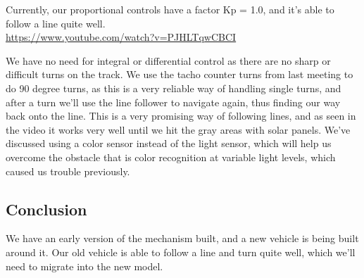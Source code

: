 Currently, our proportional controls have a factor Kp = 1.0, and it's
able to follow a line quite
well.\\\url{https://www.youtube.com/watch?v=PJHLTqwCBCI}

We have no need for integral or differential control as there are no
sharp or difficult turns on the track. We use the tacho counter turns
from last meeting to do 90 degree turns, as this is a very reliable way
of handling single turns, and after a turn we'll use the line follower
to navigate again, thus finding our way back onto the line. This is a
very promising way of following lines, and as seen in the video it works
very well until we hit the gray areas with solar panels. We've discussed
using a color sensor instead of the light sensor, which will help us
overcome the obstacle that is color recognition at variable light
levels, which caused us trouble previously.

\subsection{Conclusion}

We have an early version of the mechanism built, and a new vehicle is
being built around it. Our old vehicle is able to follow a line and turn
quite well, which we'll need to migrate into the new model.
